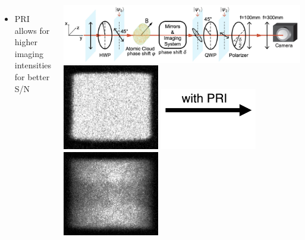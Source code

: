 \documentclass[26pt, paperwidth=36in,paperheight=48in]{tikzposter} %
\begin{document}
\begin{columns}
{\begin{minipage}{0.28\textwidth}
\begin{minipage}{0.75\textwidth}
\begin{itemize}
				\item PRI allows for higher imaging intensities for better S/N
			\end{itemize}
		\end{minipage}
	\end{minipage}
	\begin{minipage}{0.2\textwidth}
		\hspace{-7.7cm}
		\vspace{1.3cm}
		\includegraphics[width=1.75\textwidth]{figures_retreat/polrot_setup.png}\\
		\vspace{1.0cm}
		\hspace{-4.5cm}
		\includegraphics[width=0.4\textwidth]{figures_retreat/box_abs_sound_A.png}
		\includegraphics[width=0.4\textwidth]{figures_retreat/with_PRI.png}
		\includegraphics[width=0.4\textwidth]{figures_retreat/pr_sound_A.png}
	\end{minipage}	
	\vspace{-0.1cm}
	
}

	
	


\end{columns}
\end{document}
